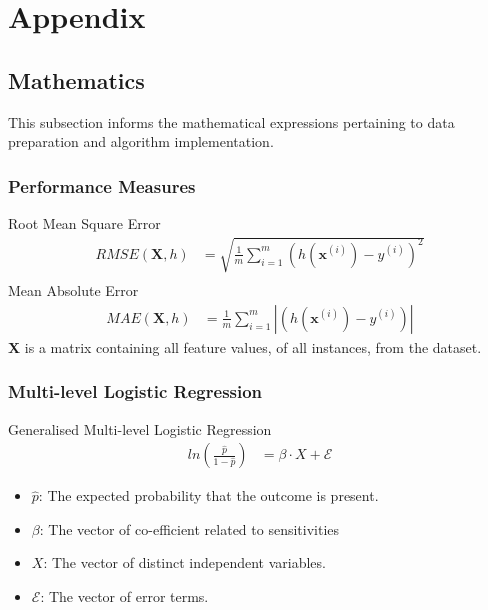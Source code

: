 \documentclass[12pt]{article}
\begin{document}
\section{Appendix}
\subsection{Mathematics}\label{math}
This subsection informs the mathematical expressions pertaining to data preparation and algorithm implementation.
\subsubsection{Performance Measures}\label{PMS}
Root Mean Square Error
\begin{align}
	RMSE(\textbf{X},h) &= \sqrt{\frac{1}{m}\sum_{i=1}^{m}(h(\textbf{x}^{(i)})-y^{(i)})^2}\\
\end{align}
Mean Absolute Error
\begin{align}
	MAE(\textbf{X},h) &= \frac{1}{m}\sum_{i=1}^{m}|(h(\textbf{x}^{(i)})-y^{(i)})|
\end{align}
\textbf{X} is a matrix containing all feature values, of all instances, from the dataset. 
\subsubsection{Multi-level Logistic Regression}\label{mllr-math]}
Generalised Multi-level Logistic Regression
\begin{align}
	ln(\frac{\hat{p}}{1-\hat{p}}) &= \beta \cdot X + \mathcal{E}
\end{align}
\begin{itemize}
	\item $\hat{p}$: The expected probability that the outcome is present.
	\item $\beta$: The vector of co-efficient related to sensitivities
	\item $X$: The vector of distinct independent variables.
	\item $\mathcal{E}$: The vector of error terms.
\end{itemize}
\end{document}
